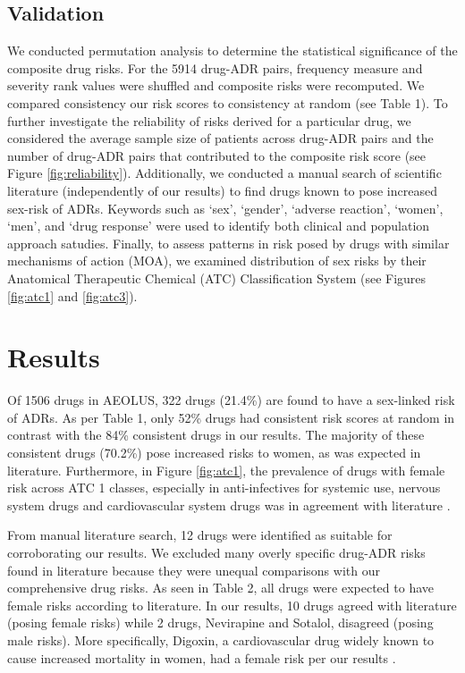 \documentclass[11pt, oneside]{article}
\begin{document}
\subsection{Validation}

We conducted permutation analysis to determine the statistical significance of the composite drug risks. For the 5914 drug-ADR pairs, frequency measure and severity rank values were shuffled and composite risks were recomputed. We compared consistency our risk scores to consistency at random (see Table 1). To further investigate the reliability of risks derived for a particular drug, we considered the average sample size of patients across drug-ADR pairs and the number of drug-ADR pairs that contributed to the composite risk score (see Figure \ref{fig:reliability}). Additionally, we conducted a manual search of scientific literature (independently of our results) to find drugs known to pose increased sex-risk of ADRs. Keywords such as `sex', `gender', `adverse reaction', `women', `men', and `drug response' were used to identify both clinical and population approach satudies. Finally, to assess patterns in risk posed by drugs with similar mechanisms of action (MOA), we examined distribution of sex risks by their Anatomical Therapeutic Chemical (ATC) Classification System (see Figures \ref{fig:atc1} and \ref{fig:atc3}).

\section{Results}

Of 1506 drugs in AEOLUS, 322 drugs (21.4\%) are found to have a sex-linked risk of ADRs. As per Table 1, only 52\% drugs had consistent risk scores at random in contrast with the 84\% consistent drugs in our results. The majority of these consistent drugs (70.2\%) pose increased risks to women, as was expected in literature. Furthermore, in Figure \ref{fig:atc1}, the prevalence of drugs with female risk across ATC 1 classes, especially in anti-infectives for systemic use, nervous system drugs and cardiovascular system drugs was in agreement with literature \cite{tran_gender_1998, drici_is_2001, rodenburg_sex_2012, tharpe_adverse_2011}.

From manual literature search, 12 drugs were identified as suitable for corroborating our results. We excluded many overly specific drug-ADR risks found in literature because they were unequal comparisons with our comprehensive drug risks. As seen in Table 2, all drugs were expected to have female risks according to literature. In our results, 10 drugs agreed with literature (posing female risks) while 2 drugs, Nevirapine and Sotalol, disagreed (posing male risks). More specifically, Digoxin, a cardiovascular drug widely known to cause increased mortality in women, had a female risk per our results \cite{whitley_sex-based_2009,tharpe_adverse_2011,rademaker_women_2001}. 
\end{document}
